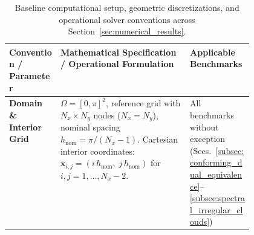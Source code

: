 \documentclass[preprint,12pt]{elsarticle}
\begin{document}
\begin{table}[!htbp]
    \centering
    \footnotesize
    \renewcommand{\arraystretch}{0.88}
    \setlength{\tabcolsep}{3.5pt}
    \caption{Baseline computational setup, geometric discretizations, and operational solver conventions across Section~\ref{sec:numerical_results}.}
    \label{tab:baseline_computational_setup}
    \begin{tabularx}{\linewidth}{@{}
        >{\raggedright\arraybackslash}p{0.21\linewidth}
        >{\raggedright\arraybackslash}X
        >{\raggedright\arraybackslash}p{0.26\linewidth}
        @{}}
        \toprule
        \textbf{Convention / Parameter}                                                                                                                                                                                                                                                                     &
        \textbf{Mathematical Specification / Operational Formulation}                                                                                                                                                                                                                                       &
        \textbf{Applicable Benchmarks}                                                                                                                                                                                                                                                                        \\
        \midrule
        \textbf{Domain \& Interior Grid}                                                                                                                                                                                                                                                                    &
        $\Omega = [0, \pi]^2$, reference grid with $N_x \times N_y$ nodes ($N_x = N_y$), nominal spacing $h_{\mathrm{nom}} = \pi / (N_x - 1)$. \newline
        Cartesian interior coordinates: $\mathbf{x}_{i,j} = (i\,h_{\mathrm{nom}}, \; j\,h_{\mathrm{nom}})$ for $i, j = 1, \dots, N_x - 2$.                                                                                                                                                                  &
        All benchmarks without exception (Secs.~\ref{subsec:conforming_dual_equivalence}--\ref{subsec:spectral_irregular_clouds})                                                                                                                                                                             \\

\end{tabularx}
\end{table}
\end{document}
